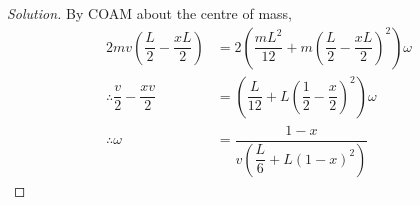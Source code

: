 \documentclass[fleqn, a4paper, 12pt]{article}
\theoremstyle{definition}
\theoremstyle{theorem}
\newenvironment{solution}
{\begin{proof}[Solution]\let\qed\relax}
	{\end{proof}}
\begin{document}
\begin{solution}
	By COAM about the centre of mass,
	\begin{align*}
		2 m v \left( \dfrac{L}{2} - \dfrac{xL}{2} \right) &= 2 \left( \dfrac{m L^2}{12} + m \left( \dfrac{L}{2} - \dfrac{xL}{2} \right)^2 \right) \omega\\
		\therefore \dfrac{v}{2} - \dfrac{x v}{2} &= \left( \dfrac{L}{12} + L \left( \dfrac{1}{2} - \dfrac{x}{2} \right)^2 \right) \omega\\
		\therefore \omega &= \dfrac{1 - x}{v \left( \dfrac{L}{6} + L (1 - x)^2 \right)}
	\end{align*}
\end{solution}
\end{document}
